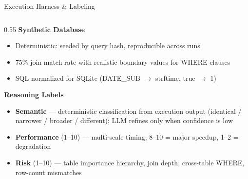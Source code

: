 \documentclass[10pt,aspectratio=169]{beamer}
\newcommand{\Raleway}{\sffamily}
\begin{document}
\begin{frame}{Execution Harness \& Labeling}
\begin{columns}[T]
    \begin{column}{0.55\textwidth}
      {\small\Raleway\bfseries\color{aggieblue} Synthetic Database}\\[0.4em]
      \footnotesize
      \begin{itemize}
        \setlength{\itemsep}{0.3em}
        \item Deterministic: seeded by query hash, reproducible across runs
        \item 75\% join match rate with realistic boundary values for WHERE clauses
        \item SQL normalized for SQLite (DATE\_SUB $\to$ strftime, true $\to$ 1)
      \end{itemize}

      \vspace{0.3em}
      {\small\Raleway\bfseries\color{aggieblue} Reasoning Labels}\\[0.4em]
      \footnotesize
      \begin{itemize}
        \setlength{\itemsep}{0.3em}
        \item \textbf{Semantic} --- deterministic classification from execution output (identical / narrower / broader / different); LLM refines only when confidence is low
        \item \textbf{Performance} (1--10) --- multi-scale timing; 8--10 = major speedup, 1--2 = degradation
        \item \textbf{Risk} (1--10) --- table importance hierarchy, join depth, cross-table WHERE, row-count mismatches
      \end{itemize}
    \end{column}

  \end{columns}
\end{frame}

\end{document}
